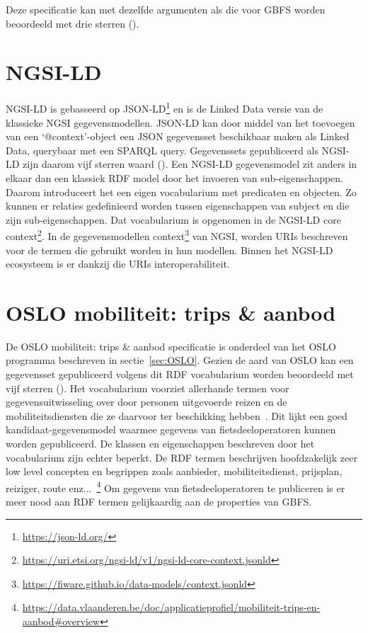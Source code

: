Deze specificatie kan met dezelfde argumenten als die voor GBFS worden beoordeeld met drie sterren (\ast \ast \ast).

\section{NGSI-LD}
\label{sec:ngsi-ld}
NGSI-LD is gebasseerd op JSON-LD\footnote{\url{https://json-ld.org/}} en is de Linked Data versie van de klassieke NGSI gegevensmodellen. JSON-LD kan door middel van het toevoegen van een `@context'-object een JSON gegevensset beschikbaar maken als Linked Data, querybaar met een SPARQL query. Gegevenssets gepubliceerd als NGSI-LD zijn daarom vijf sterren waard (\ast \ast \ast \ast \ast).
Een NGSI-LD gegevensmodel zit anders in elkaar dan een klassiek RDF model door het invoeren van sub-eigenschappen. Daarom introduceert het een eigen vocabularium met predicaten en objecten. Zo kunnen er relaties gedefinieerd worden tussen eigenschappen van subject en die zijn sub-eigenschappen. Dat vocabularium is opgenomen in de NGSI-LD core context\footnote{\url{https://uri.etsi.org/ngsi-ld/v1/ngsi-ld-core-context.jsonld}}. In de gegevensmodellen context\footnote{\url{https://fiware.github.io/data-models/context.jsonld}} van NGSI, worden URIs beschreven voor de termen die gebruikt worden in hun modellen. Binnen het NGSI-LD ecosysteem is er dankzij die URIs interoperabiliteit. 

\section{OSLO mobiliteit: trips \& aanbod}
\label{sec:trips&aanbod}
De OSLO mobiliteit: trips \& aanbod specificatie is onderdeel van het OSLO programma beschreven in sectie~\ref{sec:OSLO}. Gezien de aard van OSLO kan een gegevensset gepubliceerd volgens dit RDF vocabularium worden beoordeeld met vijf sterren (\ast \ast \ast \ast \ast). Het vocabularium voorziet allerhande termen voor gegevensuitwisseling over door personen uitgevoerde reizen en de mobiliteitsdiensten die ze daarvoor ter beschikking hebben~\cite{oslomobiliteit}. Dit lijkt een goed kandidaat-gegevensmodel waarmee gegevens van fietsdeeloperatoren kunnen worden gepubliceerd. De klassen en eigenschappen beschreven door het vocabularium zijn echter beperkt. De RDF termen beschrijven hoofdzakelijk zeer low level concepten en begrippen zoals aanbieder, mobiliteitsdienst, prijsplan, reiziger, route enz...~\footnote{\url{https://data.vlaanderen.be/doc/applicatieprofiel/mobiliteit-trips-en-aanbod\#overview}} Om gegevens van fietsdeeloperatoren te publiceren is er meer nood aan RDF termen gelijkaardig aan de properties van GBFS.

